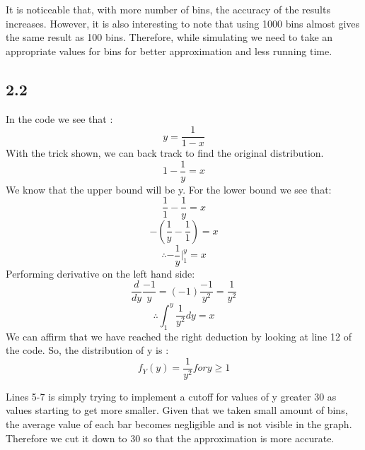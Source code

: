 \documentclass[answers]{exam}
\begin{document}
      It is noticeable that, with more number of bins, the accuracy of the results increases. However, it is also interesting to note that using 1000 bins almost gives the same result as 100 bins. Therefore, while simulating we need to take an appropriate values for bins for better approximation and less running time.

  \subsection*{2.2}  
      In the code we see that :
         $$y=\frac{1}{1-x} $$
         With the trick shown, we can back track to find the original distribution.
        $$1-\frac{1}{y}=x $$
        We know that the upper bound will be y. For the lower bound we see that:
        $$\frac{1}{1}-\frac{1}{y}=x $$
        $$-(\frac{1}{y}-\frac{1}{1})=x $$
        $$\therefore - \frac{1}{y}\Biggr|^{y}_{1}=x $$
        Performing derivative on the left hand side:
        $$\frac{d}{dy} \frac{-1}{y}=(-1)\frac{-1}{y^2}=\frac{1}{y^2}$$
        $$\therefore \int_{1}^{y} \frac{1}{y^2} dy=x$$
        We can affirm that we have reached the right deduction by looking at line 12 of the code.
        So, the distribution of y is :
        $$f_Y(y)=\frac{1}{y^2} for y \geq 1$$
         
        Lines 5-7 is simply trying to implement a cutoff for values of y greater 30 as values starting to get more smaller. Given that we taken small amount of bins, the average value of each bar becomes negligible and is not visible in the graph. Therefore we cut it down to 30 so that the approximation is more accurate.
\end{document}
